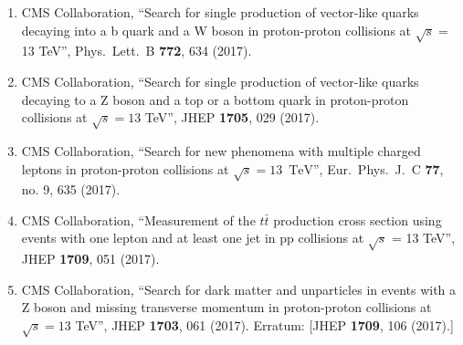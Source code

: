 \begin{enumerate}
\item CMS Collaboration, ``Search for single production of vector-like quarks decaying into a b quark and a W boson in proton-proton collisions at $\sqrt s =$ 13 TeV'', Phys.\ Lett.\ B {\bf 772}, 634 (2017).

\item CMS Collaboration, ``Search for single production of vector-like quarks decaying to a Z boson and a top or a bottom quark in proton-proton collisions at $ \sqrt{s}=13 $ TeV'', JHEP {\bf 1705}, 029 (2017).

\item CMS Collaboration, ``Search for new phenomena with multiple charged leptons in proton-proton collisions at $\sqrt{s}= 13$ $\,\text {TeV}$'', Eur.\ Phys.\ J.\ C {\bf 77}, no. 9, 635 (2017).

\item CMS Collaboration, ``Measurement of the $t \bar t$ production cross section using events with one lepton and at least one jet in pp collisions at $\sqrt{s}$  = 13 TeV'', JHEP {\bf 1709}, 051 (2017).

\item CMS Collaboration, ``Search for dark matter and unparticles in events with a Z boson and missing transverse momentum in proton-proton collisions at $ \sqrt{s}=13 $ TeV'', JHEP {\bf 1703}, 061 (2017).
  Erratum: [JHEP {\bf 1709}, 106 (2017).]


\end{enumerate}
